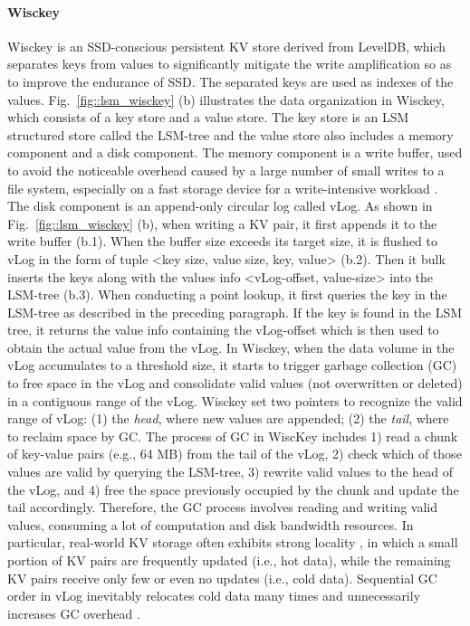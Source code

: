 \documentclass[sigconf]{acmart}
\begin{document}
\paragraph{Wisckey} Wisckey is an SSD-conscious persistent KV store derived from LevelDB, which separates keys from values to significantly mitigate the write amplification so as to improve the endurance of SSD. The separated keys are used as indexes of the values. Fig.~\ref{fig::lsm_wisckey} (b) illustrates the data organization in Wisckey, which consists of a key store and a value store. The key store is an LSM structured store called the LSM-tree and the value store also includes a memory component and a disk component. The memory component is a write buffer, used to avoid the noticeable overhead caused by a large number of small writes to a file system, especially on a fast storage device for a write-intensive workload \cite{Arrakis, Wisckey}. The disk component is an append-only circular log called vLog. As shown in Fig.~\ref{fig::lsm_wisckey} (b), when writing a KV pair, it first appends it to the write buffer (b.1). When the buffer size exceeds its target size, it is flushed to vLog in the form of tuple \textless key size, value size, key, value\textgreater{} (b.2). Then it bulk inserts the keys along with the values info \textless vLog-offset, value-size\textgreater{} into the LSM-tree (b.3). When conducting a point lookup, it first queries the key in the LSM-tree as described in the preceding paragraph. If the key is found in the LSM tree, it returns the value info containing the vLog-offset which is then used to obtain the actual value from the vLog. In Wisckey, when the data volume in the vLog accumulates to a threshold size, it starts to trigger garbage collection (GC) to free space in the vLog and consolidate valid values (not overwritten or deleted) in a contiguous range of the vLog. Wisckey set two pointers to recognize the valid range of vLog: (1) the \textit{head}, where new values are appended; (2) the \textit{tail}, where to reclaim space by GC. The process of GC in WiscKey includes 1) read a chunk of key-value pairs (e.g., 64 MB) from the tail of the vLog, 2) check which of those values are valid by querying the LSM-tree, 3) rewrite valid values to the head of the vLog, and 4) free the space previously occupied by the chunk and update the tail accordingly. Therefore, the GC process involves reading and writing valid values, consuming a lot of computation and disk bandwidth resources.  In particular, real-world KV storage often exhibits strong locality \cite{Workload}, in which a small portion of KV pairs are frequently updated (i.e., hot data), while the remaining KV pairs receive only few or even no updates (i.e., cold data). Sequential GC order in vLog inevitably relocates cold data many times and unnecessarily increases GC overhead \cite{HashKV}.
\end{document}
